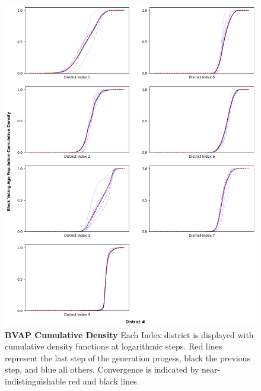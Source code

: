 \documentclass{article}
\begin{document}
\begin{figure}
    \centering
    \includegraphics[scale=.45]{images/bvap_kde_convergence.png}
    \caption{\textbf{BVAP Cumulative Density} Each Index district is displayed with cumulative density functions at logarithmic steps. Red lines represent the last step of the generation progess, black the previous step, and blue all others. Convergence is indicated by near-indistinguishable red and black lines.}

\end{figure}
\end{document}
